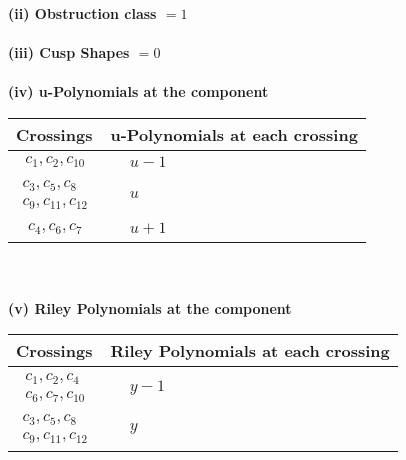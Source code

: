 \documentclass[1p]{elsarticle_modified}
\theoremstyle{definition}
\begin{document}
\flushleft \textbf{(ii) Obstruction class $= 1$}\\~\\
\flushleft \textbf{(iii) Cusp Shapes $= 0$}\\~\\
\newpage\renewcommand{\arraystretch}{1}
\flushleft \textbf{(iv) u-Polynomials at the component}\newline \\
\begin{tabular}{m{50pt}|m{274pt}}
Crossings & \hspace{64pt}u-Polynomials at each crossing \\
\hline $$\begin{aligned}c_{1},c_{2},c_{10}\end{aligned}$$&$\begin{aligned}
&u-1
\end{aligned}$\\
\hline $$\begin{aligned}c_{3},c_{5},c_{8}\\c_{9},c_{11},c_{12}\end{aligned}$$&$\begin{aligned}
&u
\end{aligned}$\\
\hline $$\begin{aligned}c_{4},c_{6},c_{7}\end{aligned}$$&$\begin{aligned}
&u+1
\end{aligned}$\\
\hline
\end{tabular}\\~\\
\newpage\renewcommand{\arraystretch}{1}
\flushleft \textbf{(v) Riley Polynomials at the component}\newline \\
\begin{tabular}{m{50pt}|m{274pt}}
Crossings & \hspace{64pt}Riley Polynomials at each crossing \\
\hline $$\begin{aligned}c_{1},c_{2},c_{4}\\c_{6},c_{7},c_{10}\end{aligned}$$&$\begin{aligned}
&y-1
\end{aligned}$\\
\hline $$\begin{aligned}c_{3},c_{5},c_{8}\\c_{9},c_{11},c_{12}\end{aligned}$$&$\begin{aligned}
&y
\end{aligned}$\\
\hline
\end{tabular}\\~\\
\end{document}
